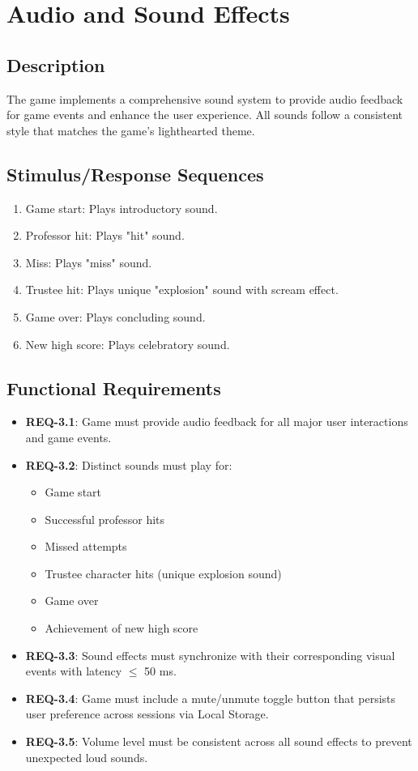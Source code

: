\documentclass[11pt]{scrreprt}
\begin{document}
\section{Audio and Sound Effects}

\subsection{Description}
The game implements a comprehensive sound system to provide audio feedback for game events and enhance the user experience. All sounds follow a consistent style that matches the game's lighthearted theme.

\subsection{Stimulus/Response Sequences}
\begin{enumerate}
  \item Game start: Plays introductory sound.
  \item Professor hit: Plays "hit" sound.
  \item Miss: Plays "miss" sound.
  \item Trustee hit: Plays unique "explosion" sound with scream effect.
  \item Game over: Plays concluding sound.
  \item New high score: Plays celebratory sound.
\end{enumerate}

\subsection{Functional Requirements}
\begin{itemize}
  \item \textbf{REQ-3.1}: Game must provide audio feedback for all major user interactions and game events.
  \item \textbf{REQ-3.2}: Distinct sounds must play for:
    \begin{itemize}
      \item Game start
      \item Successful professor hits
      \item Missed attempts
      \item Trustee character hits (unique explosion sound)
      \item Game over
      \item Achievement of new high score
    \end{itemize}
  \item \textbf{REQ-3.3}: Sound effects must synchronize with their corresponding visual events with latency $\leq$ 50 ms.
  \item \textbf{REQ-3.4}: Game must include a mute/unmute toggle button that persists user preference across sessions via Local Storage.
  \item \textbf{REQ-3.5}: Volume level must be consistent across all sound effects to prevent unexpected loud sounds.
\end{itemize}
\end{document}
